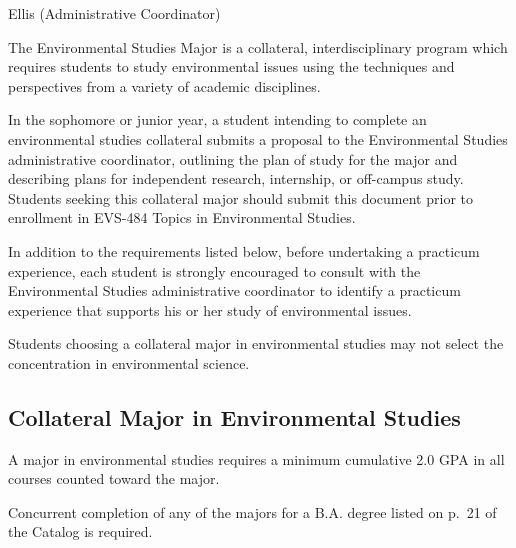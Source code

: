 \documentclass[
  letterpaper,
]{scrbook}
\begin{document}
Ellis (Administrative Coordinator)

The Environmental Studies Major is a collateral, interdisciplinary
program which requires students to study environmental issues using the
techniques and perspectives from a variety of academic disciplines.

In the sophomore or junior year, a student intending to complete an
environmental studies collateral submits a proposal to the Environmental
Studies administrative coordinator, outlining the plan of study for the
major and describing plans for independent research, internship, or
off-campus study. Students seeking this collateral major should submit
this document prior to enrollment in EVS-484 Topics in Environmental
Studies.

In addition to the requirements listed below, before undertaking a
practicum experience, each student is strongly encouraged to consult
with the Environmental Studies administrative coordinator to identify a
practicum experience that supports his or her study of environmental
issues.

Students choosing a collateral major in environmental studies may not
select the concentration in environmental science.

\subsection{Collateral Major in Environmental
Studies}\label{collateral-major-in-environmental-studies}

A major in environmental studies requires a minimum cumulative 2.0 GPA
in all courses counted toward the major.

Concurrent completion of any of the majors for a B.A. degree listed on
p.~21 of the Catalog is required.
\end{document}
